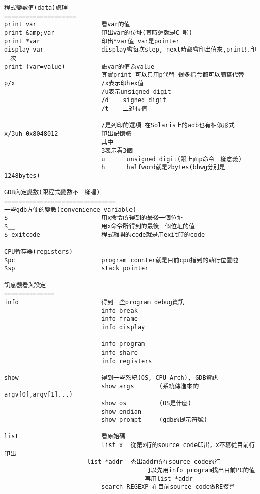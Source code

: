 \begin{verbatim}
程式變數值(data)處理
====================
print var                  看var的值
print &amp;var             印出var的位址(其時這就是C 啦)
print *var                 印出*var值 var是pointer
display var                display會每次step, next時都會印出值來,print只印一次
print (var=value)          設var的值為value
                           其實print 可以只用p代替 很多指令都可以簡寫代替
p/x                        /x表示印hex值
                           /u表示unsigned digit
                           /d    signed digit
                           /t    二進位值
                           
                           /是列印的選項 在Solaris上的adb也有相似形式
x/3uh 0x8048012            印出記憶體
                           其中
                           3表示看3個
                           u      unsigned digit(跟上面p命令一樣意義) 
                           h      halfword就是2bytes(bhwg分別是1248bytes)

GDB內定變數(跟程式變數不一樣喔)
===============================
一些gdb方便的變數(convenience variable)
$_                         用x命令所得到的最後一個位址
$__                        用x命令所得到的最後一個位址的值
$_exitcode                 程式離開的code就是用exit時的code

CPU暫存器(registers)
$pc                        program counter就是目前cpu指到的執行位置啦
$sp                        stack pointer

訊息觀看與設定
==============
info                       得到一些program debug資訊
                           info break
                           info frame
                           info display

                           info program
                           info share
                           info registers
                           
show                       得到一些系統(OS, CPU Arch), GDB資訊
                           show args       (系統傳進來的argv[0],argv[1]...)
                           show os         (OS是什麼)
                           show endian
                           show prompt     (gdb的提示符號)

list                       看原始碼
                           list x  從第x行的source code印出，x不寫從目前行印出
	                   list *addr  秀出addr所在source code的行
                                       可以先用info program找出目前PC的值
                                       再用list *addr
                           search REGEXP 在目前source code做RE搜尋


\end{verbatim}

